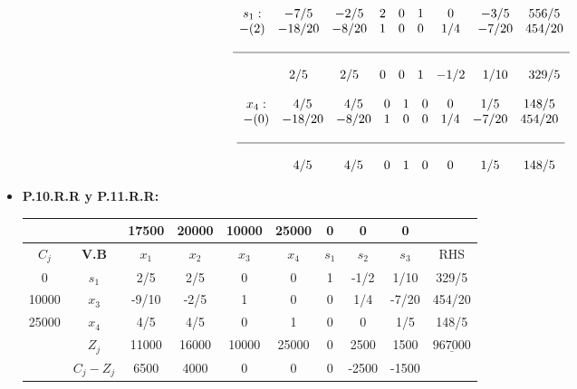 \documentclass{templateNote}
\begin{document}
\begin{itemize}
    \begin{equation*}
        \begin{array}{ccccccccc}
            s_1: & -7/5 & -2/5 & 2 & 0 & 1 & 0 & -3/5 & 556/5 \\
            -(2) & -18/20 & -8/20 & 1 & 0 & 0 & 1/4 & -7/20 & 454/20 \\
            \\ \hline \\
            & 2/5 & 2/5 & 0 & 0 & 1 & -1/2 & 1/10 & 329/5
        \end{array}
    \end{equation*}
    
    \begin{equation*}
        \begin{array}{ccccccccc}
            x_4: & 4/5 & 4/5 & 0 & 1 & 0 & 0 & 1/5 & 148/5 \\
            -(0) & -18/20 & -8/20 & 1 & 0 & 0 & 1/4 & -7/20 & 454/20 \\
            \\ \hline \\
            & 4/5 & 4/5 & 0 & 1 & 0 & 0 & 1/5 & 148/5
        \end{array}
    \end{equation*}

    \item \textbf{P.10.R.R y P.11.R.R:}
    \begin{center}
        \begin{tabular}{|c|c|c|c|c|c|c|c|c|c|}
            \hline
            & & 17500 & 20000 & 10000 & 25000 & 0 & 0 & 0 & \\ \hline
            $C_j$ & \textbf{V.B} & $x_1$ & $x_2$ & $x_3$ & $x_4$ & $s_1$ & $s_2$ & $s_3$ & RHS \\ \hline
            0 & $s_1$ & 2/5 & 2/5 & 0 & 0 & 1 & -1/2 & 1/10 & 329/5 \\
            10000 & $x_3$ & -9/10 & -2/5 & 1 & 0 & 0 & 1/4 & -7/20 & 454/20 \\
            25000 & $x_4$ & 4/5 & 4/5 & 0 & 1 & 0 & 0 & 1/5 & 148/5 \\ \hline
            & $Z_j$ & 11000 & 16000 & 10000 & 25000 & 0 & 2500 & 1500 & $\underline{967000}$ \\ \hline
            & $C_j - Z_j$ & 6500 & 4000 & 0 & 0 & 0 & -2500 & -1500 & \\ \hline
        \end{tabular}
    \end{center}
    

\end{itemize}
\end{document}
